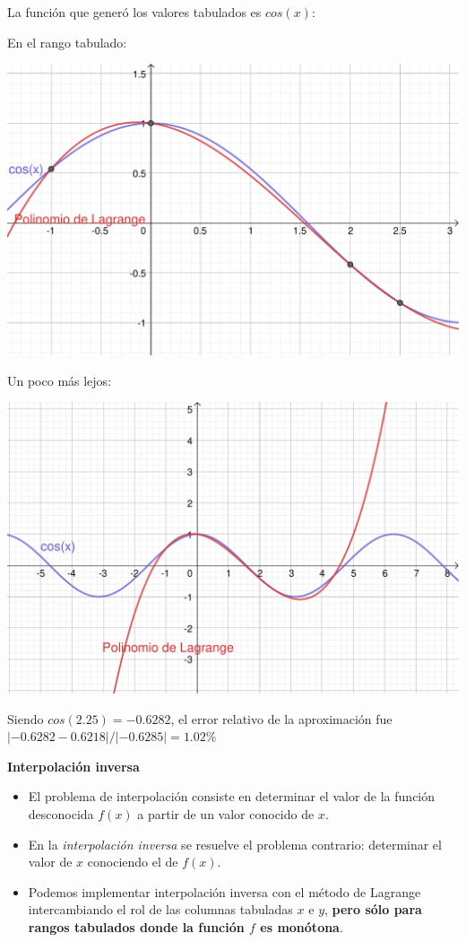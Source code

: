 \documentclass[openany]{book}
\providecommand{\tightlist}{%
  \setlength{\itemsep}{0pt}\setlength{\parskip}{0pt}}
\begin{document}
La función que generó los valores tabulados es \(cos(x)\):

En el rango tabulado:

\begin{center}\includegraphics[width=1\linewidth]{Plots/U4/lagrange2} \end{center}

Un poco más lejos:

\begin{center}\includegraphics[width=1\linewidth]{Plots/U4/lagrange} \end{center}

Siendo \(cos(2.25) = -0.6282\), el error relativo de la aproximación fue \(|-0.6282-0.6218| / |-0.6285| = 1.02\%\)

\textbf{Interpolación inversa}

\begin{itemize}
\tightlist
\item
  El problema de interpolación consiste en determinar el valor de la función desconocida \(f(x)\) a partir de un valor conocido de \(x\).
\item
  En la \emph{interpolación inversa} se resuelve el problema contrario: determinar el valor de \(x\) conociendo el de \(f(x)\).
\item
  Podemos implementar interpolación inversa con el método de Lagrange intercambiando el rol de las columnas tabuladas \(x\) e \(y\), \textbf{pero sólo para rangos tabulados donde la función \(f\) es monótona}.
\end{itemize}
\end{document}
